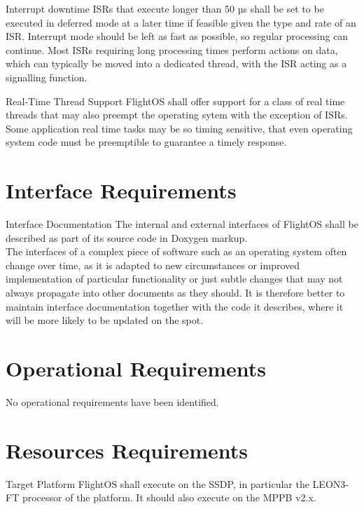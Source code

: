  {Interrupt downtime}{%
\glspl{ISR} that execute longer than 50 µs shall be set to be executed in
deferred mode at a later time if feasible given the type and rate of an \gls{ISR}.
}{
Interrupt mode should be left as fast as possible, so regular processing can
continue. Most \glspl{ISR} requiring long processing times perform actions on
data, which can typically be moved into a dedicated thread, with the \gls{ISR}
acting as a signalling function.
}%

 {Real-Time Thread Support}{%
FlightOS shall offer support for a class of real time threads that may also
preempt the operating sytem with the exception of \glspl{ISR}.
}{%
Some application real time tasks may be so timing sensitive, that even
operating system code must be preemptible to guarantee a timely response.
}%

\section{Interface Requirements}

 {Interface Documentation}{%
The internal and external interfaces of FlightOS shall be described as part
of its source code in Doxygen markup.\\

}{
The interfaces of a complex piece of software such as an operating system
often change over time, as it is adapted to new circumstances or improved
implementation of particular functionality or just subtle changes that may not
always propagate into other documents as they should. It is therefore better to
maintain interface documentation together with the code it describes, where it
will be more likely to be updated on the spot.
}%


\section{Operational Requirements}

No operational requirements have been identified.


\section{Resources Requirements}

 {Target Platform}{%
FlightOS shall execute on the \gls{SSDP}, in particular the \gls{LEON3-FT}
processor of the platform. It should also execute on the \gls{MPPB} v2.x.
}{}%


